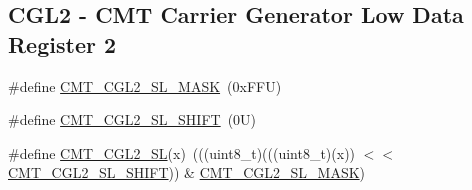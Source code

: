 \subsection*{C\+G\+L2 -\/ C\+MT Carrier Generator Low Data Register 2}
\begin{DoxyCompactItemize}
\item 
\#define \mbox{\hyperlink{group___c_m_t___register___masks_gafd7f251bad02bcf7549874db413adcf9}{C\+M\+T\+\_\+\+C\+G\+L2\+\_\+\+S\+L\+\_\+\+M\+A\+SK}}~(0x\+F\+F\+U)
\item 
\#define \mbox{\hyperlink{group___c_m_t___register___masks_ga5a5d53932d1fcce0a0f2e9fc29400df8}{C\+M\+T\+\_\+\+C\+G\+L2\+\_\+\+S\+L\+\_\+\+S\+H\+I\+FT}}~(0\+U)
\item 
\#define \mbox{\hyperlink{group___c_m_t___register___masks_ga78f805fee13018151bbb94de65001f7e}{C\+M\+T\+\_\+\+C\+G\+L2\+\_\+\+SL}}(x)~(((uint8\+\_\+t)(((uint8\+\_\+t)(x)) $<$$<$ \mbox{\hyperlink{group___c_m_t___register___masks_ga5a5d53932d1fcce0a0f2e9fc29400df8}{C\+M\+T\+\_\+\+C\+G\+L2\+\_\+\+S\+L\+\_\+\+S\+H\+I\+FT}})) \& \mbox{\hyperlink{group___c_m_t___register___masks_gafd7f251bad02bcf7549874db413adcf9}{C\+M\+T\+\_\+\+C\+G\+L2\+\_\+\+S\+L\+\_\+\+M\+A\+SK}})
\end{DoxyCompactItemize}
